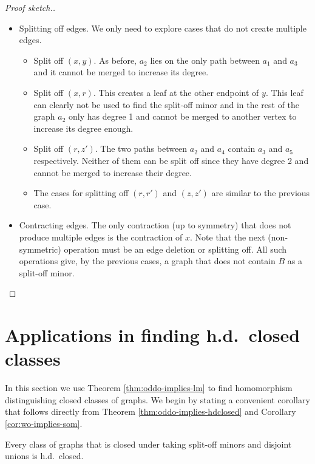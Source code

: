 \documentclass[11pt]{article}
\begin{document}
\begin{proof}[Proof sketch.]
\begin{itemize}
\begin{itemize}
            \item Delete $r$. Then every path between $a_1$ and $a_3$ goes through $a_2$. Again, $a_2$ cannot be merged with other vertices to increase its degree. Thus $a_2$ will be isolated after splitting off the path around it.

           \item Delete $z$. The argument is similar to the previous cases.
        \end{itemize}
        \item Splitting off edges. We only need to explore cases that do not create multiple edges.
        \begin{itemize}
            \item Split off $(x,y)$. As before, $a_2$ lies on the only path between $a_1$ and $a_3$ and it cannot be merged to increase its degree.
            \item Split off $(x,r)$. This creates a leaf at the other endpoint of $y$. This leaf can clearly not be used to find the split-off minor and in the rest of the graph $a_2$ only has degree 1 and cannot be merged to another vertex to increase its degree enough.
            \item Split off $(r,z')$. The two paths between $a_2$ and $a_4$ contain $a_3$ and $a_5$ respectively. Neither of them can be split off since they have degree 2 and cannot be merged to increase their degree.
            
            \item The cases for splitting off $(r,r')$ and $(z,z')$ are similar to the previous case.
        \end{itemize}

        \item Contracting edges. The only contraction (up to symmetry) that does not produce multiple edges is the contraction of $x$. Note that the next (non-symmetric) operation must be an edge deletion or splitting off. All such operations give, by the previous cases, a graph that does not contain $B$ as a split-off minor.
    \end{itemize}
\end{proof}

\section{Applications in finding h.d.\ closed classes}

In this section we use Theorem \ref{thm:oddo-implies-lm} to find homomorphism distinguishing closed classes of graphs. 
We begin by stating a convenient corollary that follows directly from Theorem \ref{thm:oddo-implies-hdclosed} and Corollary \ref{cor:wo-implies-som}.
\begin{corollary}
\label{cor:som-means-hdclosed}
    Every class of graphs that is closed under taking split-off minors and disjoint unions is h.d.\ closed.
\end{corollary}
\end{document}
